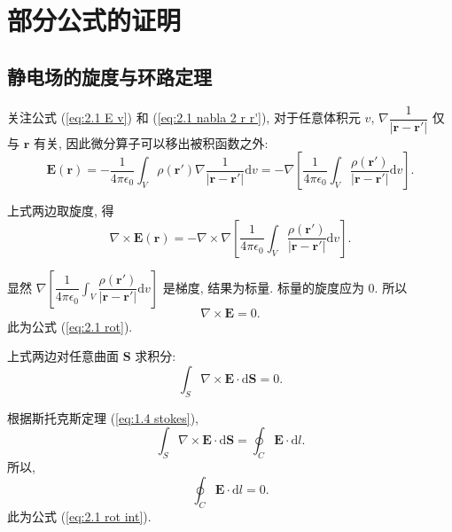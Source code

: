 \section{部分公式的证明}
\subsection{静电场的旋度与环路定理}
关注公式 (\ref{eq:2.1 E v}) 和 (\ref{eq:2.1 nabla 2 r r'}), 对于任意体积元 $v$, $\nabla\dfrac{1}{|\bm{r}-\bm{r'}|}$ 仅与 $\bm{r}$ 有关, 因此微分算子可以移出被积函数之外:
\begin{equation}
    \bm{E}(\bm{r})=-\frac{1}{4\pi\epsilon_0}\int_V\rho(\bm{r'})\nabla\frac{1}{|\bm{r}-\bm{r'}|}\mathrm{d}v=-\nabla\left[\frac{1}{4\pi\epsilon_0}\int_V\frac{\rho(\bm{r'})}{|\bm{r}-\bm{r'}|}\mathrm{d}v\right].
\end{equation}

上式两边取旋度, 得
\begin{equation}
    \nabla\times\bm{E}(\bm{r})=-\nabla\times\nabla\left[\frac{1}{4\pi\epsilon_0}\int_V\frac{\rho(\bm{r'})}{|\bm{r}-\bm{r'}|}\mathrm{d}v\right].
\end{equation}

显然 $\nabla\left[\dfrac{1}{4\pi\epsilon_0}\displaystyle\int_V\dfrac{\rho(\bm{r'})}{|\bm{r}-\bm{r'}|}\mathrm{d}v\right]$ 是梯度, 结果为标量. 标量的旋度应为 0. 所以
\begin{equation}
    \nabla\times\bm{E}=0.
\end{equation}
此为公式 (\ref{eq:2.1 rot}).

上式两边对任意曲面 $\bm{S}$ 求积分:
\begin{equation}
    \int_S\nabla\times\bm{E}\cdot\mathrm{d}\bm{S}=0.
\end{equation}

根据斯托克斯定理 (\ref{eq:1.4 stokes}),
\begin{equation}
    \int_S\nabla\times\bm{E}\cdot\mathrm{d}\bm{S}=\oint_C\bm{E}\cdot\mathrm{d}l.
\end{equation}
所以,
\begin{equation}
    \oint_C\bm{E}\cdot\mathrm{d}l=0.
\end{equation}
此为公式 (\ref{eq:2.1 rot int}).
